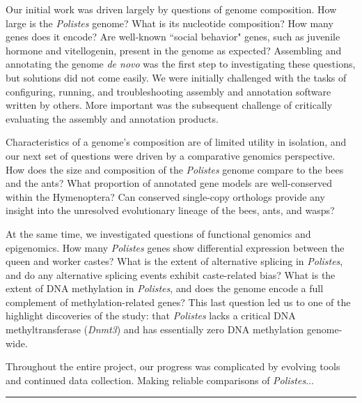 Our initial work was driven largely by questions of genome composition.
How large is the \textit{Polistes} genome?
What is its nucleotide composition?
How many genes does it encode?
Are well-known ``social behavior" genes, such as juvenile hormone and vitellogenin, present in the genome as expected?
Assembling and annotating the genome \textit{de novo} was the first step to investigating these questions, but solutions did not come easily.
We were initially challenged with the tasks of configuring, running, and troubleshooting assembly and annotation software written by others.
More important was the subsequent challenge of critically evaluating the assembly and annotation products.

Characteristics of a genome's composition are of limited utility in isolation, and our next set of questions were driven by a comparative genomics perspective.
How does the size and composition of the \textit{Polistes} genome compare to the bees and the ants?
What proportion of annotated gene models are well-conserved within the Hymenoptera?
Can conserved single-copy orthologs provide any insight into the unresolved evolutionary lineage of the bees, ants, and wasps?

At the same time, we investigated questions of functional genomics and epigenomics.
How many \textit{Polistes} genes show differential expression between the queen and worker castes?
What is the extent of alternative splicing in \textit{Polistes}, and do any alternative splicing events exhibit caste-related bias?
What is the extent of DNA methylation in \textit{Polistes}, and does the genome encode a full complement of methylation-related genes?
This last question led us to one of the highlight discoveries of the study: that \textit{Polistes} lacks a critical DNA methyltransferase (\textit{Dnmt3}) and has essentially zero DNA methylation genome-wide.

Throughout the entire project, our progress was complicated by evolving tools and continued data collection.
Making reliable comparisons of \textit{Polistes}...

\noindent\rule{4in}{0.4pt}

